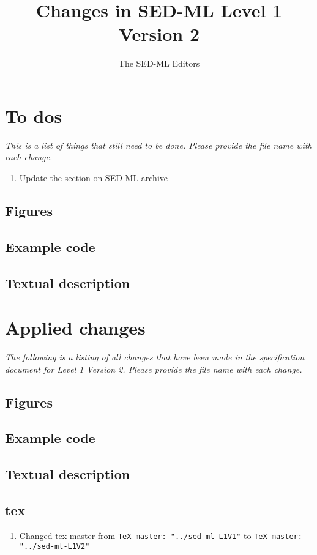 \documentclass{article}
\newcommand{\code}[1]{\texttt{#1}}
\begin{document}
\title{Changes in SED-ML Level 1 Version 2}
\author{The SED-ML Editors}

\maketitle


\section{To dos}
\emph{This is a list of things that still need to be done. Please provide the file name with each change.}

\begin{enumerate}
\item Update the section on SED-ML archive
\end{enumerate}

\subsection{Figures}

\subsection{Example code}

\subsection{Textual description}

\section{Applied changes}
\emph{The following is a listing of all changes that have been made in the specification document for Level 1 Version 2. Please provide the file name with each change.}

\subsection{Figures}

\subsection{Example code}

\subsection{Textual description}

\subsection{tex}

\begin{enumerate}
\item Changed tex-master from  \code{TeX-master: "../sed-ml-L1V1"} to  \code{TeX-master: "../sed-ml-L1V2"}
\end{enumerate}
\end{document}
